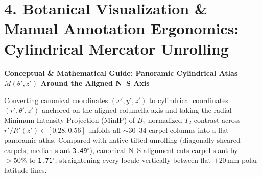 \documentclass[10pt,a4paper]{article}
\renewcommand{\_}{\origunderscore\allowbreak}
\begin{document}
\section*{4. Botanical Visualization \& Manual Annotation Ergonomics: Cylindrical Mercator Unrolling}

\begin{guidehdr}
{\small\bfseries\color{kiwigreen!75!black}Conceptual \& Mathematical Guide: Panoramic Cylindrical Atlas $M(\theta', z')$ Around the Aligned N--S Axis}
\end{guidehdr}
Converting canonical coordinates $(x', y', z')$ to cylindrical coordinates $(r', \theta', z')$ anchored on the aligned columella axis and taking the radial Minimum Intensity Projection (MinIP) of $B_1$-normalized $T_2$ contrast across $r'/R'(z') \in [0.28, 0.56]$ unfolds all $\sim 30$--$34$ carpel columns into a flat panoramic atlas. Compared with native tilted unrolling (diagonally sheared carpels, median slant \texttt{3.49$^\circ$}), canonical N--S alignment cuts carpel slant by \textbf{$>50\%$} to \texttt{1.71$^\circ$}, straightening every locule vertically between flat $\pm 20\,\text{mm}$ polar latitude lines.
\end{document}

